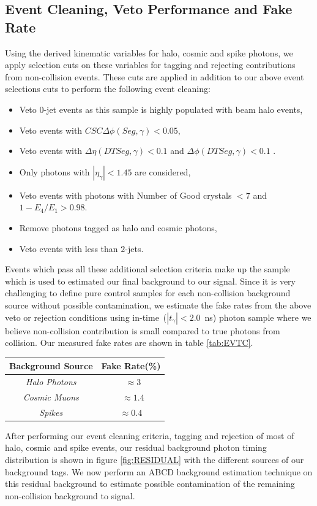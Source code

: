 \subsection{Event Cleaning, Veto Performance and Fake Rate}
Using the derived kinematic variables for halo, cosmic and spike photons, we apply selection cuts on these variables for tagging and rejecting contributions from non-collision events. These cuts are applied in addition to our above event selections cuts to perform the following event cleaning:
\begin{itemize}
\item Veto 0-jet events as this sample is highly populated with beam halo events, 
\item Veto events with $CSC\Delta\phi(Seg,\gamma) < 0.05$,
\item Veto events with $\Delta\eta(DT Seg,\gamma) < 0.1$ and $\Delta\phi(DT Seg,\gamma) < 0.1$ .
\item Only photons with $|\eta_{\gamma}| < 1.45$ are considered,
\item Veto events with photons with Number of Good crystals $ < 7$ and $ 1-E_{4}/E_{1} > 0.98$.
\item Remove photons tagged as halo and cosmic photons,
\item Veto events with less than $2$-jets.
\end{itemize}
Events which pass all these additional selection criteria make up the sample which is used to estimated our final background to our signal.
Since it is very challenging to define pure control samples for each non-collision background source without possible contamination, we estimate the fake rates from the above veto or rejection conditions using in-time~($|t_{\gamma}| < 2.0$~ns) photon sample where we believe non-collision contribution is small compared to true photons from collision.
Our measured fake rates are shown in table \ref{tab:EVTC}.
\begin{center}
\centering
\begin{tabular}{|c| c|}
\hline
\bfseries{Background Source} & \bfseries {Fake Rate}(\%)\\
\hline\hline
\textit{Halo Photons} & ~$\approx 3$ \\
\textit{Cosmic Muons} & ~$\approx 1.4$ \\
\textit{Spikes} & $\approx 0.4$ \\
\hline
\end{tabular}
\label{tab:EVTC} 
\end{center}
After performing our event cleaning criteria, tagging and rejection of most of halo, cosmic and spike events, our residual background photon timing distribution is shown in figure \ref{fig:RESIDUAL} with the different sources of our background tags.
We now perform an \textsf{ABCD} background estimation technique on this residual background to estimate possible contamination of the remaining non-collision background to signal.

